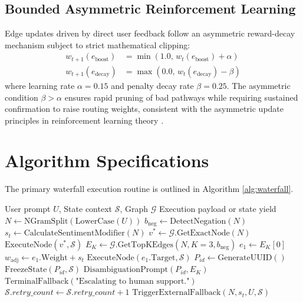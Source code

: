 \documentclass[10pt,twocolumn]{article}
\newcommand{\YIELD}[1]{\STATE \textbf{yield} #1}
\begin{document}
\subsection{Bounded Asymmetric Reinforcement Learning}
Edge updates driven by direct user feedback follow an asymmetric reward-decay mechanism subject to strict mathematical clipping:
\begin{align}
w_{t+1}(e_{\text{boost}}) &= \min\left(1.0, \, w_t(e_{\text{boost}}) + \alpha\right) \\
w_{t+1}(e_{\text{decay}}) &= \max\left(0.0, \, w_t(e_{\text{decay}}) - \beta\right)
\end{align}
where learning rate $\alpha = 0.15$ and penalty decay rate $\beta = 0.25$. The asymmetric condition $\beta > \alpha$ ensures rapid pruning of bad pathways while requiring sustained confirmation to raise routing weights, consistent with the asymmetric update principles in reinforcement learning theory \cite{reinforcement}.

\section{Algorithm Specifications}

The primary waterfall execution routine is outlined in Algorithm \ref{alg:waterfall}.

\begin{algorithm}[H]
\caption{ORCHESTRATOR\_ENGINE\_V6 Main Loop}
\label{alg:waterfall}
\begin{algorithmic}[1]
\REQUIRE User prompt $U$, State context $\mathcal{S}$, Graph $\mathcal{G}$
\ENSURE Execution payload or state yield
\STATE $N \gets \text{NGramSplit}(\text{LowerCase}(U))$
\STATE $b_{\text{neg}} \gets \text{DetectNegation}(N)$
\STATE $s_t \gets \text{CalculateSentimentModifier}(N)$
    \STATE $v^* \gets \mathcal{G}.\text{GetExactNode}(N)$
    \RETURN $\text{ExecuteNode}(v^*, \mathcal{S})$
\ELSE
    \STATE $E_K \gets \mathcal{G}.\text{GetTopKEdges}(N, K=3, b_{\text{neg}})$
        \STATE $e_1 \gets E_K[0]$
        \STATE $w_{\text{adj}} \gets e_1.\text{Weight} + s_t$
            \RETURN $\text{ExecuteNode}(e_1.\text{Target}, \mathcal{S})$
            \STATE $P_{id} \gets \text{GenerateUUID}()$
            \STATE $\text{FreezeState}(P_{id}, \mathcal{S})$
            \YIELD $\text{DisambiguationPrompt}(P_{id}, E_K)$
        \ENDIF
    \ENDIF
\ENDIF
{}
    \YIELD $\text{TerminalFallback}(\text{"Escalating to human support."})$
\ELSE
    \STATE $\mathcal{S}.retry\_count \gets \mathcal{S}.retry\_count + 1$
    \STATE $\text{TriggerExternalFallback}(N, s_t, U, \mathcal{S})$
\ENDIF
\end{algorithmic}
\end{algorithm}
\end{document}
